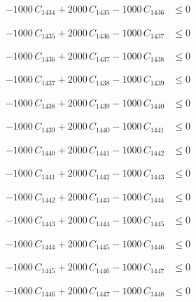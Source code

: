 \documentclass[a4paper,11pt]{article}
\begin{document}
\begin{align}
-1000\,C_{1434} + 2000\,C_{1435} - 1000\,C_{1436} &\leq 0 \nonumber
\end{align}

\begin{align}
-1000\,C_{1435} + 2000\,C_{1436} - 1000\,C_{1437} &\leq 0 \nonumber
\end{align}

\begin{align}
-1000\,C_{1436} + 2000\,C_{1437} - 1000\,C_{1438} &\leq 0 \nonumber
\end{align}

\begin{align}
-1000\,C_{1437} + 2000\,C_{1438} - 1000\,C_{1439} &\leq 0 \nonumber
\end{align}

\begin{align}
-1000\,C_{1438} + 2000\,C_{1439} - 1000\,C_{1440} &\leq 0 \nonumber
\end{align}

\begin{align}
-1000\,C_{1439} + 2000\,C_{1440} - 1000\,C_{1441} &\leq 0 \nonumber
\end{align}

\begin{align}
-1000\,C_{1440} + 2000\,C_{1441} - 1000\,C_{1442} &\leq 0 \nonumber
\end{align}

\begin{align}
-1000\,C_{1441} + 2000\,C_{1442} - 1000\,C_{1443} &\leq 0 \nonumber
\end{align}

\begin{align}
-1000\,C_{1442} + 2000\,C_{1443} - 1000\,C_{1444} &\leq 0 \nonumber
\end{align}

\begin{align}
-1000\,C_{1443} + 2000\,C_{1444} - 1000\,C_{1445} &\leq 0 \nonumber
\end{align}

\begin{align}
-1000\,C_{1444} + 2000\,C_{1445} - 1000\,C_{1446} &\leq 0 \nonumber
\end{align}

\begin{align}
-1000\,C_{1445} + 2000\,C_{1446} - 1000\,C_{1447} &\leq 0 \nonumber
\end{align}

\begin{align}
-1000\,C_{1446} + 2000\,C_{1447} - 1000\,C_{1448} &\leq 0 \nonumber
\end{align}
\end{document}
